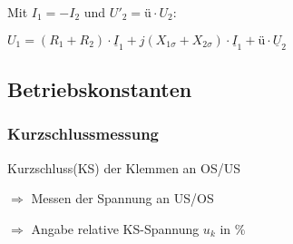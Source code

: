 \documentclass[a4paper,11pt]{article}
\begin{document}
	Mit $I_{1} = -I_{2}$ und $U'_{2} = \text{ü} \cdot U_2$:

	$U_{1} = (R_1 + R_2) \cdot \underline{I}_1 + j(X_{1\sigma} + X_{2\sigma}) \cdot \underline{I}_1 + \text{ü} \cdot \underline{U}_2$

	\subsection{Betriebskonstanten}
	\subsubsection{Kurzschlussmessung}

	Kurzschluss(KS) der Klemmen an  OS/US
	
	$\Rightarrow$ Messen der Spannung an US/OS 
	
	$\Rightarrow$ Angabe relative KS-Spannung $u_{k}$ in $\%$

	\subsubsection{}

	



	
\end{document}
